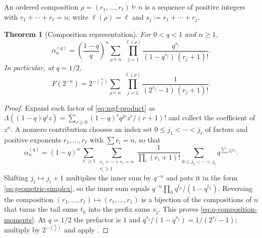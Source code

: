 \documentclass[11pt,oneside,openany]{book}
\newtheorem{theorem}{Theorem}[chapter]
\theoremstyle{definition}
\theoremstyle{remark}
\begin{document}
An ordered composition $\rho=(r_1,\ldots,r_\ell)\vDash n$ is a sequence of positive
integers with $r_1+\cdots+r_\ell=n$; write $\ell(\rho)=\ell$ and
$s_j:=r_1+\cdots+r_j$.

\begin{theorem}[Composition representation]\label{thm:fabius-composition}
For $0<q<1$ and $n\ge1$,
\begin{equation}\label{eq:q-composition-moments}
 \alpha_n^{(q)}
 =\left(\frac{1-q}{q}\right)^{\!n}
  \sum_{\rho\vDash n}\ \prod_{j=1}^{\ell(\rho)}
  \frac{q^{s_j}}{(1-q^{s_j})\,(r_j+1)!}.
\end{equation}
In particular, at $q=1/2$,
\begin{equation}\label{eq:fabius-composition}
 F(2^{-n})
 =2^{-\binom n2}\sum_{\rho\vDash n}\
 \prod_{j=1}^{\ell(\rho)}\frac1{(2^{s_j}-1)\,(r_j+1)!}.
\end{equation}
\end{theorem}

\begin{proof}
Expand each factor of \eqref{eq:mgf-product} as
$\Lambda((1-q)q^jz)=\sum_{r\ge0}(1-q)^rq^{jr}z^r/(r+1)!$ and collect the coefficient of
$z^n$.  A nonzero contribution chooses an index set $0\le j_1<\cdots<j_\ell$ of factors
and positive exponents $r_1,\ldots,r_\ell$ with $\sum r_i=n$, so that
\[
 \alpha_n^{(q)}
 =(1-q)^n\sum_{\ell\ge1}
  \sum_{\substack{r_1+\cdots+r_\ell=n\\ r_i\ge1}}
  \frac1{\prod_i(r_i+1)!}
  \sum_{0\le j_1<\cdots<j_\ell}q^{\sum_ij_ir_i}.
\]
Shifting $j_i\mapsto j_i+1$ multiplies the inner sum by $q^{-n}$ and puts it in the form
\eqref{eq:geometric-simplex}, so the inner sum equals
$q^{-n}\prod_hq^{t_h}/(1-q^{t_h})$.  Reversing the composition
$(r_1,\ldots,r_\ell)\mapsto(r_\ell,\ldots,r_1)$ is a bijection of the compositions of
$n$ that turns the tail sums $t_h$ into the prefix sums $s_j$.  This proves
\eqref{eq:q-composition-moments}.  At $q=1/2$ the prefactor is $1$ and
$q^{s_j}/(1-q^{s_j})=1/(2^{s_j}-1)$; multiply by $2^{-\binom n2}$ and apply
\Cref{thm:fabius-half-moment}.
\end{proof}
\end{document}
